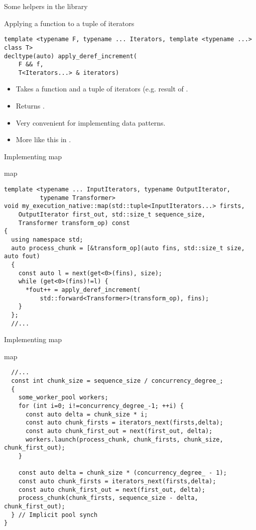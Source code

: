\begin{frame}[t,fragile]{Some helpers in the library}
\begin{block}{Applying a function to a tuple of iterators}
\begin{lstlisting}
template <typename F, typename ... Iterators, template <typename ...> class T>
decltype(auto) apply_deref_increment(
    F && f, 
    T<Iterators...> & iterators)
\end{lstlisting}
\end{block}
\vfill
\begin{itemize}
  \item Takes a function  and a tuple of iterators (e.g. result of .
  \item Returns .
  \item Very convenient for implementing data patterns.
  \item More like this in .
\end{itemize}
\end{frame}


\begin{frame}[t,fragile]{Implementing map}
\begin{block}{map}
\begin{lstlisting}
template <typename ... InputIterators, typename OutputIterator, 
          typename Transformer>
void my_execution_native::map(std::tuple<InputIterators...> firsts,
    OutputIterator first_out, std::size_t sequence_size, 
    Transformer transform_op) const
{
  using namespace std;
  auto process_chunk = [&transform_op](auto fins, std::size_t size, auto fout)
  {
    const auto l = next(get<0>(fins), size);
    while (get<0>(fins)!=l) {
      *fout++ = apply_deref_increment(
          std::forward<Transformer>(transform_op), fins);
    }
  };
  //...
\end{lstlisting}
\end{block}
\end{frame}

\begin{frame}[t,fragile]{Implementing map}
\begin{block}{map}
\begin{lstlisting}
  //...
  const int chunk_size = sequence_size / concurrency_degree_;
  {
    some_worker_pool workers;
    for (int i=0; i!=concurrency_degree_-1; ++i) {
      const auto delta = chunk_size * i;
      const auto chunk_firsts = iterators_next(firsts,delta);
      const auto chunk_first_out = next(first_out, delta);
      workers.launch(process_chunk, chunk_firsts, chunk_size, chunk_first_out);
    }

    const auto delta = chunk_size * (concurrency_degree_ - 1);
    const auto chunk_firsts = iterators_next(firsts,delta);
    const auto chunk_first_out = next(first_out, delta);
    process_chunk(chunk_firsts, sequence_size - delta, chunk_first_out);
  } // Implicit pool synch
}

\end{lstlisting}
\end{block}
\end{frame}


